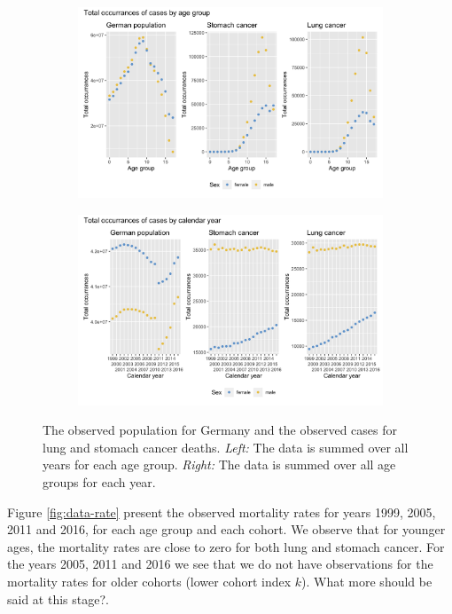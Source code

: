 \begin{figure}
    \centering
    \begin{subfigure}[b]{.6\linewidth}
        \includegraphics[width=\linewidth]{real-data/real-data-univariate/Figures/data-age-total.png}
    \end{subfigure}
    
    \begin{subfigure}[b]{.6\linewidth}
        \includegraphics[width=\linewidth]{real-data/real-data-univariate/Figures/data-year-total.png}
    \end{subfigure}
    \caption{The observed population for Germany and the observed cases for lung and stomach cancer deaths. \textit{Left:} The data is summed over all years for each age group. \textit{Right:} The data is summed over all age groups for each year.}
    \label{fig:data-total}
\end{figure}

Figure \ref{fig:data-rate} present the observed mortality rates for years 1999, 2005, 2011 and 2016, for each age group and each cohort. We observe that for younger ages, the mortality rates are close to zero for both lung and stomach cancer. For the years 2005, 2011 and 2016 we see that we do not have observations for the  mortality rates for older cohorts (lower cohort index $k$). \textcolor{myDarkGreen}{What more should be said at this stage?}.

